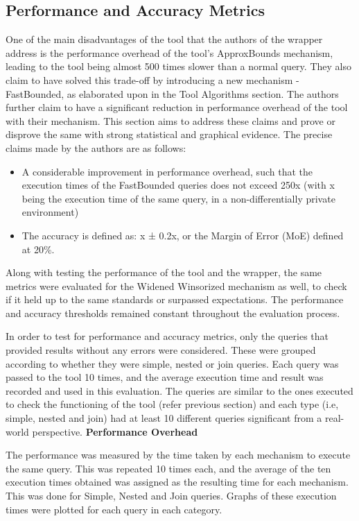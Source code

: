 \documentclass[acmsmall]{acmart}
\begin{document}
\subsection{Performance and Accuracy Metrics}\label{4.4}
One of the main disadvantages of the tool that the authors of the wrapper address is the performance overhead of the tool’s ApproxBounds mechanism, leading to the tool being almost 500 times slower than a normal query. They also claim to have solved this trade-off by introducing a new mechanism - FastBounded, as elaborated upon in the Tool Algorithms section. The authors further claim to have a significant reduction in performance overhead of the tool with their mechanism. This section aims to address these claims and prove or disprove the same with strong statistical and graphical evidence. 
\newline
The precise claims made by the authors are as follows:
\begin{itemize}
    \item A considerable improvement in performance overhead, such that the execution times of the FastBounded queries does not exceed 250x (with x being the execution time of the same query, in a non-differentially private environment)
    \item The accuracy is defined as: x ± 0.2x, or the Margin of Error (MoE) defined at 20\%.
\end{itemize}

Along with testing the performance of the tool and the wrapper, the same metrics were evaluated for the Widened Winsorized mechanism as well, to check if it held up to the same standards or surpassed expectations. The performance and accuracy thresholds remained constant throughout the evaluation process.

In order to test for performance and accuracy metrics, only the queries that provided results without any errors were considered. These were grouped according to whether they were simple, nested or join queries. Each query was passed to the tool 10 times, and the average execution time and result was recorded and used in this evaluation. The queries are similar to the ones executed to check the functioning of the tool (refer previous section) and each type (i.e, simple, nested and join) had at least 10 different queries significant from a real-world perspective.
\newline
\newline
\textbf{Performance Overhead}

The performance was measured by the time taken by each mechanism to execute the same query. This was repeated 10 times each, and the average of the ten execution times obtained was assigned as the resulting time for each mechanism. This was done for Simple, Nested and Join queries. Graphs of these execution times were plotted for each query in each category.
\end{document}
